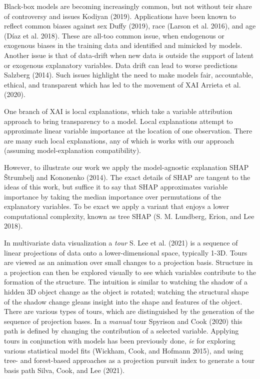 \documentclass[
]{article}
\begin{document}
Black-box models are becoming increasingly common, but not without teir share of controversy and issues Kodiyan (2019). Applications have been known to reflect common biases against sex Duffy (2019), race (Larson et al. 2016), and age (Díaz et al. 2018). These are all-too common issue, when endogenous or exogenous biases in the training data and identified and mimicked by models. Another issue is that of data-drift when new data is outside the support of latent or exogenous explanatory variables. Data drift can lead to worse predictions Salzberg (2014). Such issues highlight the need to make models fair, accountable, ethical, and transparent which has led to the movement of XAI Arrieta et al. (2020).

One branch of XAI is local explanations, which take a variable attribution approach to bring transparency to a model. Local explanations attempt to approximate linear variable importance at the location of one observation. There are many such local explanations, any of which is works with our approach (assuming model-explanation compatibility).

However, to illustrate our work we apply the model-agnostic explanation SHAP Štrumbelj and Kononenko (2014). The exact details of SHAP are tangent to the ideas of this work, but suffice it to say that SHAP approximates variable importance by taking the median importance over permutations of the explanatory variables. To be exact we apply a variant that enjoys a lower computational complexity, known as tree SHAP (S. M. Lundberg, Erion, and Lee 2018).

In multivariate data visualization a \emph{tour} S. Lee et al. (2021) is a sequence of linear projections of data onto a lower-dimensional space, typically 1-3D. Tours are viewed as an animation over small changes to a projection basis. Structure in a projection can then be explored visually to see which variables contribute to the formation of the structure. The intuition is similar to watching the shadow of a hidden 3D object change as the object is rotated; watching the structural shape of the shadow change gleans insight into the shape and features of the object. There are various types of tours, which are distinguished by the generation of the sequence of projection bases. In a \emph{manual} tour Spyrison and Cook (2020) this path is defined by changing the contribution of a selected variable. Applying tours in conjunction with models has been previously done, \emph{ie} for exploring various statistical model fits (Wickham, Cook, and Hofmann 2015), and using tree- and forest-based approaches as a projection pursuit index to generate a tour basis path Silva, Cook, and Lee (2021).
\end{document}
